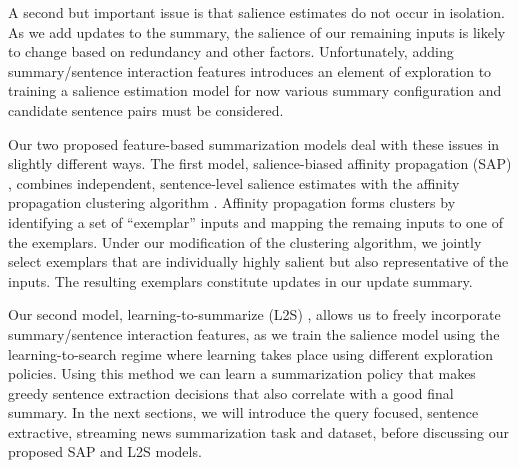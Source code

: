 A second but important issue is that salience estimates do not occur in
isolation. As we add updates to the summary, the salience of our remaining
inputs is likely to change based on redundancy and other factors.
Unfortunately, adding summary/sentence interaction features introduces an
element of exploration to training a salience estimation model for now various
summary configuration and candidate sentence pairs must be considered.

Our two proposed feature-based summarization models deal with these issues in
slightly different ways.  The first model, salience-biased affinity
propagation (SAP) \citep{kedzie2015}, combines independent, sentence-level
salience estimates with the affinity propagation clustering algorithm
\citep{frey2007clustering}. Affinity propagation forms clusters by identifying
a set of ``exemplar'' inputs and mapping the remaing inputs to one of the
exemplars. Under our modification of the clustering algorithm, we jointly
select exemplars that are individually highly salient but also representative
of the inputs. The resulting exemplars constitute updates in our update
summary.

Our second model, learning-to-summarize (L2S) \citep{kedzie2016}, allows us to
freely incorporate summary/sentence interaction features, as we train the
salience model using the learning-to-search regime \citep{daume2005,chang2015}
where learning takes place using different exploration policies. Using this
method we can learn a summarization policy that makes greedy sentence
extraction decisions that also correlate with a good final summary.  In the
next sections, we will introduce the query focused, sentence
extractive, streaming news summarization task and dataset, before discussing our proposed
SAP and L2S models.
